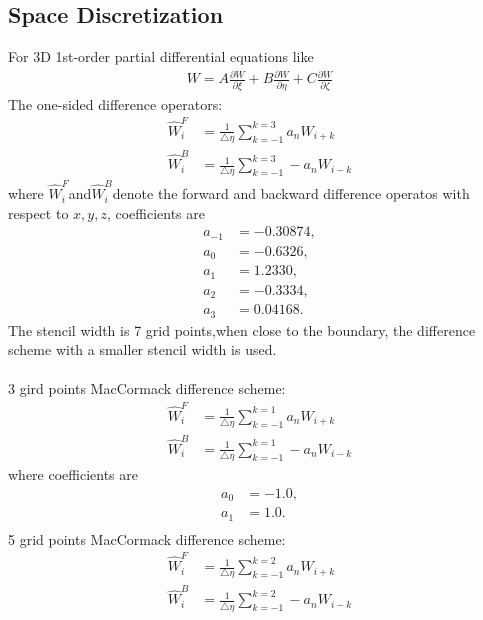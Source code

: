\subsection{Space Discretization} 
For 3D 1st-order partial differential equations like
\begin{align}
	W=A\frac{\partial W}{\partial \xi}+B\frac{\partial W}{\partial \eta}+C\frac{\partial W}{\partial \zeta}
\end{align}
The one-sided difference operators:
\begin{align}
	\hat{W}_{i}^{F} &= \frac{1}{\triangle \eta} \sum_{k=-1}^{k=3} a_{n} W_{i+k} \\ 
	\hat{W}_{i}^{B} &= \frac{1}{\triangle \eta} \sum_{k=-1}^{k=3}-a_{n} W_{i-k}
\end{align}
where $\hat{W}_i^F$and$\hat{W}_i^B$denote the forward and backward difference operatos with respect to $x,y,z$, coefficients are
\begin{subequations}
\begin{align}
	a_{-1} &= -0.30874, \\
	a_{0} &= -0.6326, \\
	a_{1} &= 1.2330, \\
	a_{2} &= -0.3334, \\
	a_{3} &= 0.04168.
\end{align} 
\end{subequations}
The stencil width is 7 grid points,when close to the boundary, the difference scheme with a smaller stencil width is used.\\ \\
3 gird points MacCormack difference scheme:
	\begin{align}
		\hat{W}_{i}^{F} &= \frac{1}{\triangle \eta} \sum_{k=-1}^{k=1} a_{n} W_{i+k} \\ 
		\hat{W}_{i}^{B} &= \frac{1}{\triangle \eta} \sum_{k=-1}^{k=1}-a_{n} W_{i-k}  
	\end{align}
where coefficients are
\begin{subequations}
\begin{align}
	a_{0} &= -1.0, \\
	a_{1} &= 1.0. \\
\end{align}  
\end{subequations}
5 grid points MacCormack difference scheme:
\begin{align}
	\hat{W}_{i}^{F} &= \frac{1}{\triangle \eta} \sum_{k=-1}^{k=2} a_{n} W_{i+k} \\ 
	\hat{W}_{i}^{B} &= \frac{1}{\triangle \eta} \sum_{k=-1}^{k=2}-a_{n} W_{i-k}  
\end{align}

